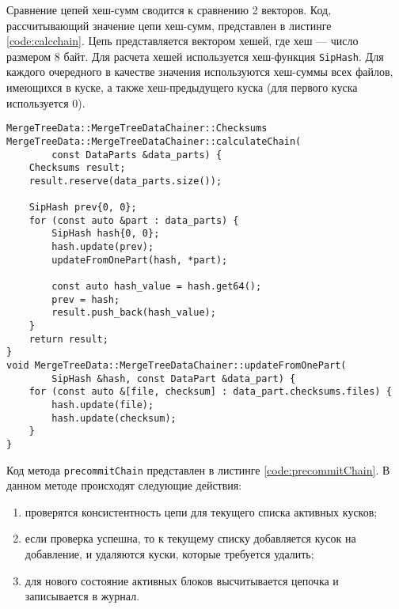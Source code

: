 Сравнение цепей хеш-сумм сводится к сравнению 2 векторов. Код, рассчитывающий значение цепи хеш-сумм, представлен в листинге \ref{code:calcchain}. Цепь представляется вектором хешей, где хеш --- число размером 8 байт. Для расчета хешей используется хеш-функция \texttt{SipHash}. Для каждого очередного в качестве значения используются хеш-суммы всех файлов, имеющихся в куске, а также хеш-предыдущего куска (для первого куска используется 0).

\pagebreak

\begin{lstlisting}[label=code:calcchain, caption={Расчет цепи хеш-сумм.}]
MergeTreeData::MergeTreeDataChainer::Checksums
MergeTreeData::MergeTreeDataChainer::calculateChain(
        const DataParts &data_parts) {
    Checksums result;
    result.reserve(data_parts.size());

    SipHash prev{0, 0};
    for (const auto &part : data_parts) {
        SipHash hash{0, 0};
        hash.update(prev);
        updateFromOnePart(hash, *part);

        const auto hash_value = hash.get64();
        prev = hash;
        result.push_back(hash_value);
    }
    return result;
}
void MergeTreeData::MergeTreeDataChainer::updateFromOnePart(
        SipHash &hash, const DataPart &data_part) {
    for (const auto &[file, checksum] : data_part.checksums.files) {
        hash.update(file);
        hash.update(checksum);
    }
}
\end{lstlisting}

Код метода \texttt{precommitChain} представлен в листинге \ref{code:precommitChain}. В данном методе происходят следующие действия:
\begin{enumerate}
    \item проверятся консистентность цепи для текущего списка активных кусков;
    \item если проверка успешна, то к текущему списку добавляется кусок на добавление, и удаляются куски, которые требуется удалить;
    \item для нового состояние активных блоков высчитывается цепочка и записывается в журнал.
\end{enumerate}

\pagebreak

